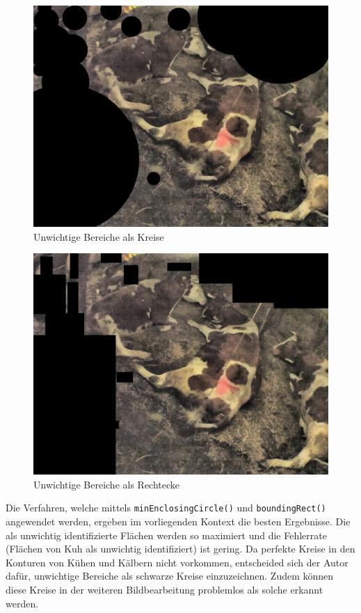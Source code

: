 \begin{figure}[H]
	\center
	\includegraphics[scale=0.43]{Grafiken/entwicklung/7unwichtigeKreise.jpg}
	\caption{Unwichtige Bereiche als Kreise } 
	\label{fig: Unwichtige Bereiche als Kreise}
\end{figure}

\begin{figure}[H]
	\center
	\includegraphics[scale=0.43]{Grafiken/entwicklung/7unwichtigeRechtecke.jpg}
	\caption{Unwichtige Bereiche als Rechtecke} 
	\label{fig: Unwichtige Bereiche als Rechtecke}
\end{figure}

Die Verfahren, welche mittels \texttt{minEnclosingCircle()} und \texttt{boundingRect()} angewendet werden, ergeben im vorliegenden Kontext die besten Ergebnisse. Die als unwichtig identifizierte Flächen werden so maximiert und die Fehlerrate (Flächen von Kuh als unwichtig identifiziert) ist gering. Da perfekte Kreise in den Konturen von Kühen und Kälbern nicht vorkommen, entscheided sich der Autor dafür, unwichtige Bereiche als schwarze Kreise einzuzeichnen. Zudem können diese Kreise in der weiteren Bildbearbeitung problemlos als solche erkannt werden.

